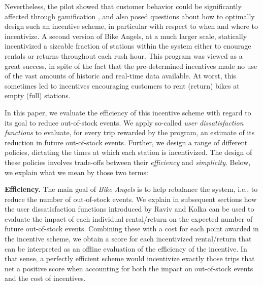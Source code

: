 Nevertheless, the pilot showed that customer behavior could be significantly affected through gamification \cite{citibikeInternal}, and also posed questions about how to optimally design such an incentive scheme, in particular with respect to when and where to incentivize. A second version of Bike Angels, at a much larger scale, statically incentivized a sizeable fraction of stations within the system either to enourage rentals or returns throughout each rush hour.
This program was viewed as a great success, in spite of the fact that the pre-determined incentives made no use of the vast amounts of historic and real-time data available. At worst, this sometimes led to incentives  encouraging customers to rent (return) bikes at empty (full) stations. %

In this paper, we evaluate the efficiency of this incentive scheme with regard to its goal to reduce out-of-stock events.  We apply so-called \emph{user dissatisfaction functions} to evaluate, for every trip rewarded by the program, an estimate of its reduction in future out-of-stock events. Further, we design a range of different policies, dictating the times at which each station is incentivized. The design of these policies involves trade-offs between their \emph{efficiency} and \emph{simplicity}. Below, we explain what we mean by those two terms:

\noindent \textbf{Efficiency.} The main goal of \emph{Bike Angels} is to help rebalance the system, i.e., to reduce the number of out-of-stock events. We explain in subsequent sections how the user dissatisfaction functions introduced by Raviv and Kolka  \cite{raviv2013optimal} can be used to evaluate the impact of each individual rental/return on the expected number of future out-of-stock events. Combining these with a cost for each point awarded in the incentive scheme, we obtain a score for each incentivized rental/return that can be interpreted as an offline evaluation of the efficiency of the incentive. In that sense, a perfectly efficient scheme would incentivize exactly those trips that net a positive score when accounting for both the impact on out-of-stock events and the cost of incentives.

